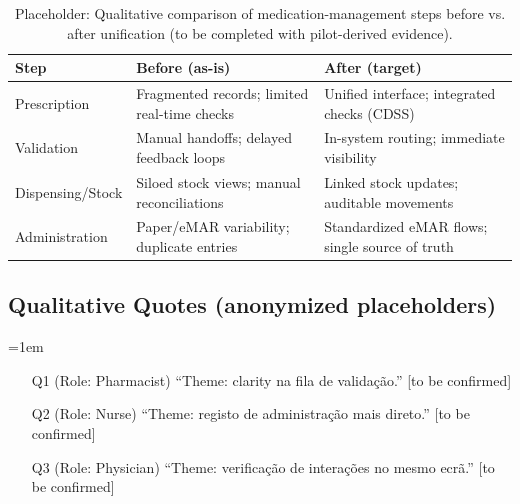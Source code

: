 \begin{table}[H]
    \centering
    \caption{Placeholder: Qualitative comparison of medication-management steps before vs. after unification (to be completed with pilot-derived evidence).}
    \label{tab:before_after_qualitative}
    \begin{tabularx}{\textwidth}{@{}l|X|X@{}}
        \toprule
        \textbf{Step} & \textbf{Before (as-is)} & \textbf{After (target)} \\
        \midrule
        Prescription & Fragmented records; limited real-time checks & Unified interface; integrated checks (CDSS) \\
        Validation & Manual handoffs; delayed feedback loops & In-system routing; immediate visibility \\
        Dispensing/Stock & Siloed stock views; manual reconciliations & Linked stock updates; auditable movements \\
        Administration & Paper/eMAR variability; duplicate entries & Standardized eMAR flows; single source of truth \\
        \bottomrule
    \end{tabularx}
\end{table}


\subsection*{Qualitative Quotes (anonymized placeholders)}
\begingroup\emergencystretch=1em
\small
\begin{itemize}
    \item [Q1] (Role: Pharmacist) “Theme: clarity na fila de validação.” [to be confirmed]
    \item [Q2] (Role: Nurse) “Theme: registo de administração mais direto.” [to be confirmed]
    \item [Q3] (Role: Physician) “Theme: verificação de interações no mesmo ecrã.” [to be confirmed]
\end{itemize}
\endgroup


